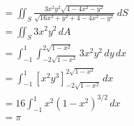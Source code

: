 \documentclass{article}
\begin{document}
\begin{align*}
                                        & = \iint_S \frac{3 x^2 y^2 \sqrt{4 - 4 x^2 - y^2}}{\sqrt{16 x^2 + y^2 + 4 - 4 x^2 - y^2}} \,dS \\
                                        & = \iint_S 3 x^2 y^2 \,dA                                                                      \\
                                        & = \int_{-1}^1 \int_{-2 \sqrt{1 - x^2}}^{2 \sqrt{1 - x^2}} 3 x^2 y^2 \,dy \,dx                 \\
                                        & = \int_{-1}^1 [x^2 y^3]_{-2 \sqrt{1 - x^2}}^{2 \sqrt{1 - x^2}} \,dx                           \\
                                        & = 16 \int_{-1}^1 x^2 (1 - x^2)^{3 / 2} \,dx                                                   \\
                                        & = \pi
\end{align*}

\setcounter{subsubsection}{12}
\subsubsection{}
\end{document}
